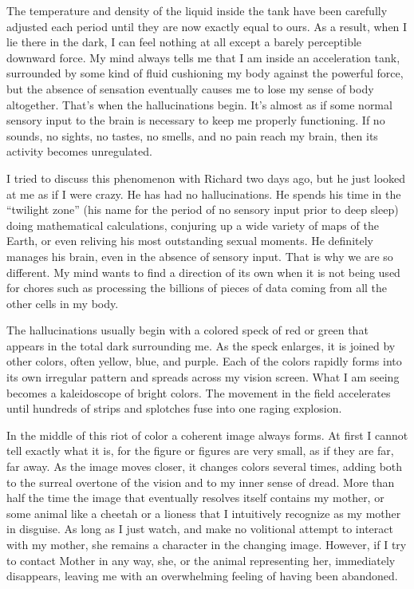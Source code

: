 \documentclass[]{article}
\begin{document}
The temperature and density of the liquid inside the tank have been carefully adjusted each period until they are now exactly equal to ours.  As a result, when I lie there in the dark, I can feel nothing at all except a barely perceptible downward force.  My mind always tells me that I am inside an acceleration tank, surrounded by some kind of fluid cushioning my body against the powerful force, but the absence of sensation eventually causes me to lose my sense of body altogether.  That’s when the hallucinations begin.  It’s almost as if some normal sensory input to the brain is necessary to keep me properly functioning.  If no sounds, no sights, no tastes, no smells, and no pain reach my brain, then its activity becomes unregulated.

I tried to discuss this phenomenon with Richard two days ago, but he just looked at me as if I were crazy.  He has had no hallucinations.  He spends his time in the “twilight zone” (his name for the period of no sensory input prior to deep sleep) doing mathematical calculations, conjuring up a wide variety of maps of the Earth, or even reliving his most outstanding sexual moments.  He definitely manages his brain, even in the absence of sensory input.  That is why we are so different.  My mind wants to find a direction of its own when it is not being used for chores such as processing the billions of pieces of data coming from all the other cells in my body.

The hallucinations usually begin with a colored speck of red or green that appears in the total dark surrounding me.  As the speck enlarges, it is joined by other colors, often yellow, blue, and purple.  Each of the colors rapidly forms into its own irregular pattern and spreads across my vision screen.  What I am seeing becomes a kaleidoscope of bright colors.  The movement in the field accelerates until hundreds of strips and splotches fuse into one raging explosion.

In the middle of this riot of color a coherent image always forms.  At first I cannot tell exactly what it is, for the figure or figures are very small, as if they are far, far away.  As the image moves closer, it changes colors several times, adding both to the surreal overtone of the vision and to my inner sense of dread.  More than half the time the image that eventually resolves itself contains my mother, or some animal like a cheetah or a lioness that I intuitively recognize as my mother in disguise.  As long as I just watch, and make no volitional attempt to interact with my mother, she remains a character in the changing image.  However, if I try to contact Mother in any way, she, or the animal representing her, immediately disappears, leaving me with an overwhelming feeling of having been abandoned.
\end{document}
